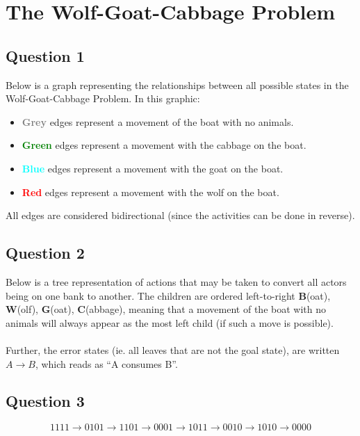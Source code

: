 \section{The Wolf-Goat-Cabbage Problem}

  \subsection{Question 1}

    Below is a graph representing the relationships between all possible states
    in the Wolf-Goat-Cabbage Problem. In this graphic:

    \begin{itemize}
      \item \textcolor{gray}{\textbf{Grey}} edges represent a movement of the
      boat with no animals.
      \item \textcolor{green}{\textbf{Green}} edges represent a movement with
      the cabbage on the boat.
      \item \textcolor{cyan}{\textbf{Blue}} edges represent a movement with the
      goat on the boat.
      \item \textcolor{red}{\textbf{Red}} edges represent a movement with the
      wolf on the boat.
    \end{itemize}
    \bigskip
    All edges are considered bidirectional (since the activities can be done in
    reverse).
    \bigskip
    

  \pagebreak
  \subsection{Question 2}

  Below is a tree representation of actions that may be taken to convert all
actors being on one bank to another. The children are ordered left-to-right
\textbf{B}(oat), \textbf{W}(olf), \textbf{G}(oat), \textbf{C}(abbage), meaning
that a movement of the boat with no animals will always appear as the most left
child (if such a move is possible).
\\\\
Further, the error states (ie. all leaves that
are not the goal state), are written $A \rightarrow B$, which reads as ``A
consumes B''.

    \bigskip

    

  \subsection{Question 3}

    \bigskip

    $$1111 \rightarrow 0101 \rightarrow 1101 \rightarrow 0001 \rightarrow 1011
    \rightarrow 0010 \rightarrow 1010 \rightarrow 0000$$
